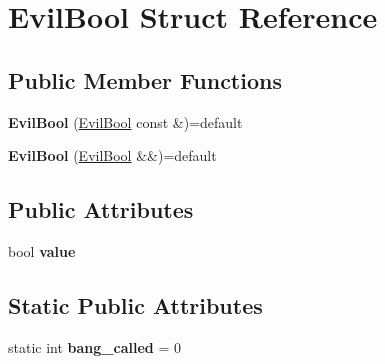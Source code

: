 \hypertarget{struct_evil_bool}{}\section{Evil\+Bool Struct Reference}
\label{struct_evil_bool}
\subsection*{Public Member Functions}
\begin{DoxyCompactItemize}
\item 
\mbox{\label{struct_evil_bool_aee2dfa00463e13454788f98f54d6835b}} 
{\bfseries Evil\+Bool} (\mbox{\hyperlink{struct_evil_bool}{Evil\+Bool}} const \&)=default
\item 
\mbox{\label{struct_evil_bool_ae47dbd8250dcd805f4c19bd9d47e19d8}} 
{\bfseries Evil\+Bool} (\mbox{\hyperlink{struct_evil_bool}{Evil\+Bool}} \&\&)=default
\end{DoxyCompactItemize}
\subsection*{Public Attributes}
\begin{DoxyCompactItemize}
\item 
\mbox{\label{struct_evil_bool_a8ac92fdea53c57512578fda5922306b2}} 
bool {\bfseries value}
\end{DoxyCompactItemize}
\subsection*{Static Public Attributes}
\begin{DoxyCompactItemize}
\item 
\mbox{\label{struct_evil_bool_ae3c32656dcdd14215f296d1e501d747f}} 
static int {\bfseries bang\+\_\+called} = 0
\end{DoxyCompactItemize}
